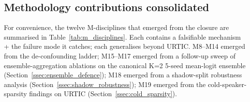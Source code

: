 \subsection{Methodology contributions consolidated}
\label{ssec:m_disciplines}

For convenience, the twelve M-disciplines that emerged from the closure are summarised in Table~\ref{tab:m_disciplines}. Each contains a falsifiable mechanism + the failure mode it catches; each generalises beyond URTIC. M8--M14 emerged from the de-confounding ladder; M15--M17 emerged from a follow-up sweep of ensemble-aggregation ablations on the canonical K=2 5-seed mean-logit ensemble (Section~\ref{ssec:ensemble_defence}); M18 emerged from a shadow-split robustness analysis (Section~\ref{ssec:shadow_robustness}); M19 emerged from the cold-speaker-sparsity findings on URTIC (Section~\ref{ssec:cold_sparsity}).

